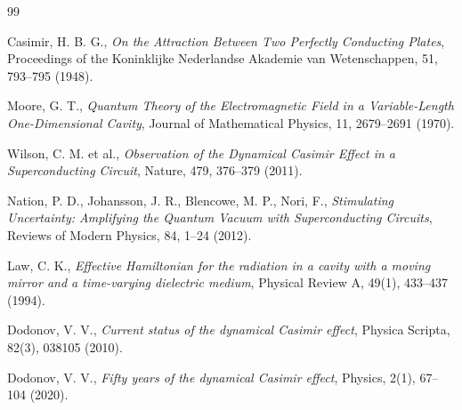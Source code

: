 \documentclass[11pt,a4paper]{article}
\begin{document}
\begin{thebibliography}{99}

Casimir, H. B. G.,
\textit{On the Attraction Between Two Perfectly Conducting Plates},
Proceedings of the Koninklijke Nederlandse Akademie van Wetenschappen,
51, 793--795 (1948).

Moore, G. T.,
\textit{Quantum Theory of the Electromagnetic Field in a Variable-Length One-Dimensional Cavity},
Journal of Mathematical Physics,
11, 2679--2691 (1970).

Wilson, C. M. et al.,
\textit{Observation of the Dynamical Casimir Effect in a Superconducting Circuit},
Nature,
479, 376--379 (2011).

Nation, P. D., Johansson, J. R., Blencowe, M. P., Nori, F.,
\textit{Stimulating Uncertainty: Amplifying the Quantum Vacuum with Superconducting Circuits},
Reviews of Modern Physics,
84, 1--24 (2012).

Law, C. K.,
\textit{Effective Hamiltonian for the radiation in a cavity with a moving mirror and a time-varying dielectric medium},
Physical Review A,
49(1), 433--437 (1994).

Dodonov, V. V.,
\textit{Current status of the dynamical Casimir effect},
Physica Scripta,
82(3), 038105 (2010).

Dodonov, V. V.,
\textit{Fifty years of the dynamical Casimir effect},
Physics,
2(1), 67--104 (2020).

\end{thebibliography}
\end{document}
